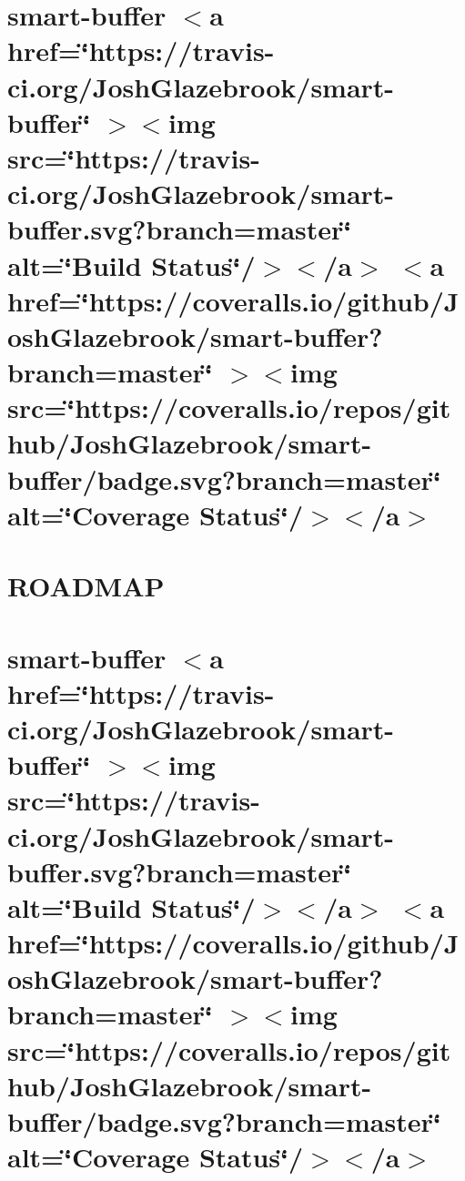 \documentclass[twoside]{book}
\newcommand{\+}{\discretionary{\mbox{\scriptsize$\hookleftarrow$}}{}{}}
\begin{document}
\chapter{smart-\/buffer \texorpdfstring{$<$}{<}a href=\char`\"{}https\+://travis-\/ci.\+org/\+Josh\+Glazebrook/smart-\/buffer\char`\"{} \texorpdfstring{$>$}{>}\texorpdfstring{$<$}{<}img src=\char`\"{}https\+://travis-\/ci.\+org/\+Josh\+Glazebrook/smart-\/buffer.\+svg?branch=master\char`\"{} alt=\char`\"{}\+Build Status\char`\"{}/\texorpdfstring{$>$}{>}\texorpdfstring{$<$}{<}/a\texorpdfstring{$>$}{>} \texorpdfstring{$<$}{<}a href=\char`\"{}https\+://coveralls.\+io/github/\+Josh\+Glazebrook/smart-\/buffer?branch=master\char`\"{} \texorpdfstring{$>$}{>}\texorpdfstring{$<$}{<}img src=\char`\"{}https\+://coveralls.\+io/repos/github/\+Josh\+Glazebrook/smart-\/buffer/badge.\+svg?branch=master\char`\"{} alt=\char`\"{}\+Coverage Status\char`\"{}/\texorpdfstring{$>$}{>}\texorpdfstring{$<$}{<}/a\texorpdfstring{$>$}{>}}
\label{md__c___users_vaishnavi_jadhav__desktop__developer_code_mean_stack_example_client_node_modules_s3880a4c75a5ea04486844b235b6e4edd}

\chapter{ROADMAP}
\label{md__c___users_vaishnavi_jadhav__desktop__developer_code_mean_stack_example_client_node_modules_smart_buffer_docs__r_o_a_d_m_a_p}

\chapter{smart-\/buffer \texorpdfstring{$<$}{<}a href=\char`\"{}https\+://travis-\/ci.\+org/\+Josh\+Glazebrook/smart-\/buffer\char`\"{} \texorpdfstring{$>$}{>}\texorpdfstring{$<$}{<}img src=\char`\"{}https\+://travis-\/ci.\+org/\+Josh\+Glazebrook/smart-\/buffer.\+svg?branch=master\char`\"{} alt=\char`\"{}\+Build Status\char`\"{}/\texorpdfstring{$>$}{>}\texorpdfstring{$<$}{<}/a\texorpdfstring{$>$}{>} \texorpdfstring{$<$}{<}a href=\char`\"{}https\+://coveralls.\+io/github/\+Josh\+Glazebrook/smart-\/buffer?branch=master\char`\"{} \texorpdfstring{$>$}{>}\texorpdfstring{$<$}{<}img src=\char`\"{}https\+://coveralls.\+io/repos/github/\+Josh\+Glazebrook/smart-\/buffer/badge.\+svg?branch=master\char`\"{} alt=\char`\"{}\+Coverage Status\char`\"{}/\texorpdfstring{$>$}{>}\texorpdfstring{$<$}{<}/a\texorpdfstring{$>$}{>}}
\label{md__c___users_vaishnavi_jadhav__desktop__developer_code_mean_stack_example_client_node_modules_smart_buffer__r_e_a_d_m_e}

\end{document}
